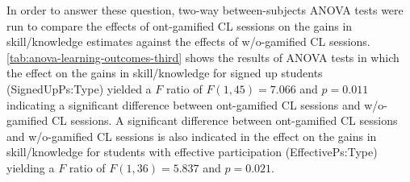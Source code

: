 In order to answer these question, two-way between-subjects ANOVA tests were run to compare the effects of ont-gamified CL sessions on the gains in skill/knowledge estimates against the effects of w/o-gamified CL sessions.
\autoref{tab:anova-learning-outcomes-third} shows the results of ANOVA tests in which
the effect on the gains in skill/knowledge for signed up students (SignedUpPs:Type) yielded a $F$ ratio of $F(1,45) = 7.066$ and $p = 0.011$ indicating a significant difference between ont-gamified CL sessions and w/o-gamified CL sessions.
A significant difference between ont-gamified CL sessions and w/o-gamified CL sessions is also indicated in the effect on the gains in skill/knowledge for students with effective participation (EffectivePs:Type) yielding a $F$ ratio of $F(1,36) = 5.837$ and $p = 0.021$.


